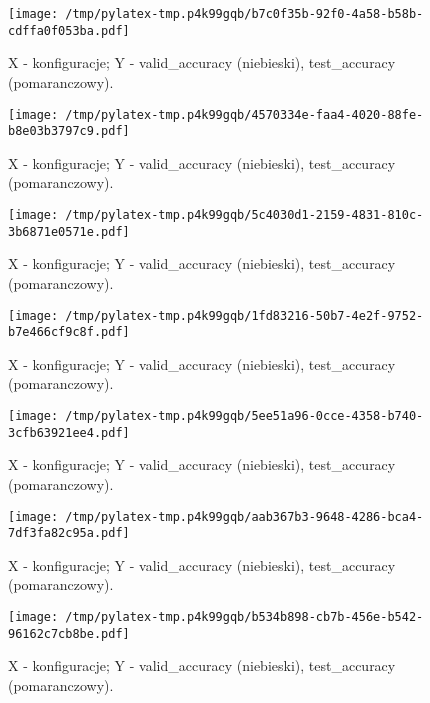 \documentclass{article}%
\begin{document}
%
\newpage%


\begin{figure}[h]%
\centering%
\texttt{[image: /tmp/pylatex-tmp.p4k99gqb/b7c0f35b-92f0-4a58-b58b-cdffa0f053ba.pdf]}%
\caption{X {-} konfiguracje; Y {-} valid\_accuracy (niebieski), test\_accuracy (pomaranczowy).}%
\end{figure}

%
\newpage%


\begin{figure}[h]%
\centering%
\texttt{[image: /tmp/pylatex-tmp.p4k99gqb/4570334e-faa4-4020-88fe-b8e03b3797c9.pdf]}%
\caption{X {-} konfiguracje; Y {-} valid\_accuracy (niebieski), test\_accuracy (pomaranczowy).}%
\end{figure}

%
\newpage%


\begin{figure}[h]%
\centering%
\texttt{[image: /tmp/pylatex-tmp.p4k99gqb/5c4030d1-2159-4831-810c-3b6871e0571e.pdf]}%
\caption{X {-} konfiguracje; Y {-} valid\_accuracy (niebieski), test\_accuracy (pomaranczowy).}%
\end{figure}

%
\newpage%


\begin{figure}[h]%
\centering%
\texttt{[image: /tmp/pylatex-tmp.p4k99gqb/1fd83216-50b7-4e2f-9752-b7e466cf9c8f.pdf]}%
\caption{X {-} konfiguracje; Y {-} valid\_accuracy (niebieski), test\_accuracy (pomaranczowy).}%
\end{figure}

%
\newpage%


\begin{figure}[h]%
\centering%
\texttt{[image: /tmp/pylatex-tmp.p4k99gqb/5ee51a96-0cce-4358-b740-3cfb63921ee4.pdf]}%
\caption{X {-} konfiguracje; Y {-} valid\_accuracy (niebieski), test\_accuracy (pomaranczowy).}%
\end{figure}

%
\newpage%


\begin{figure}[h]%
\centering%
\texttt{[image: /tmp/pylatex-tmp.p4k99gqb/aab367b3-9648-4286-bca4-7df3fa82c95a.pdf]}%
\caption{X {-} konfiguracje; Y {-} valid\_accuracy (niebieski), test\_accuracy (pomaranczowy).}%
\end{figure}

%
\newpage%


\begin{figure}[h]%
\centering%
\texttt{[image: /tmp/pylatex-tmp.p4k99gqb/b534b898-cb7b-456e-b542-96162c7cb8be.pdf]}%
\caption{X {-} konfiguracje; Y {-} valid\_accuracy (niebieski), test\_accuracy (pomaranczowy).}%
\end{figure}
\end{document}
